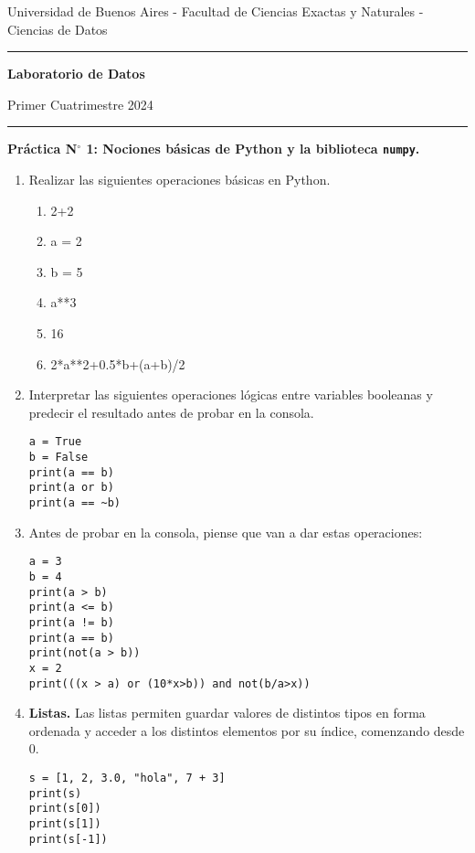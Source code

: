 \documentclass[a4paper,11pt]{article}
\theoremstyle{definition}
\begin{document}
\centerline{{\small Universidad de Buenos Aires - Facultad de Ciencias Exactas y Naturales - Ciencias de Datos}}

\vskip 0.2cm

\hrule

\vskip 0.2cm

 \centerline{{\bf\Large{\sc Laboratorio de Datos}}}

 \vskip 0.2cm

 \centerline{\ttfamily Primer Cuatrimestre 2024}

\vskip 0.2cm

 \hrule

 \bigskip
 \centerline{\bf Práctica N$^\circ$ 1: Nociones básicas de Python y la biblioteca \lstinline{numpy}.}
 \bigskip

\begin{enumerate}
\item
Realizar las siguientes operaciones básicas en Python.
\begin{enumerate}
\item 2+2
\item a = 2
\item b = 5
\item a**3
\item 16 %
\item 2*a**2+0.5*b+(a+b)/2
\end{enumerate}

\item Interpretar las siguientes operaciones lógicas entre variables booleanas y predecir el resultado antes de probar en la consola.
\begin{lstlisting}
a = True
b = False
print(a == b)
print(a or b)
print(a == ~b)
\end{lstlisting}

\item Antes de probar en la consola, piense que van a dar estas operaciones:
\begin{lstlisting}
a = 3
b = 4
print(a > b)
print(a <= b)
print(a != b)
print(a == b)
print(not(a > b))
x = 2
print(((x > a) or (10*x>b)) and not(b/a>x))
\end{lstlisting}

\item \textbf{Listas.}
Las listas permiten guardar valores de distintos tipos en forma ordenada y acceder a los distintos elementos por su índice, comenzando desde 0.
\begin{lstlisting}
s = [1, 2, 3.0, "hola", 7 + 3]
print(s)
print(s[0])
print(s[1])
print(s[-1])
\end{lstlisting}



\end{enumerate}
\end{document}
